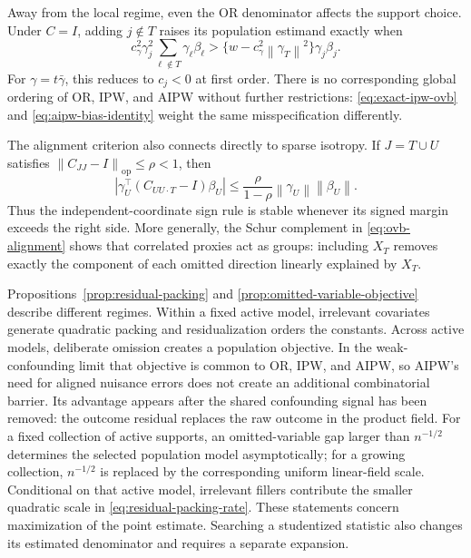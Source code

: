 \documentclass[a4paper,10pt,english]{article}
\newcommand{\norm}[1]{\left\lVert #1\right\rVert}
\begin{document}
Away from the local regime, even the OR denominator affects the support
choice.  Under $C=I$, adding $j\notin T$ raises its population estimand
exactly when
\begin{equation}\label{eq:exact-add-variable-rule}
 c_\gamma^2\gamma_j^2
 \sum_{\ell\notin T}\gamma_\ell\beta_\ell
 >\{w-c_\gamma^2\norm{\gamma_T}^2\}\gamma_j\beta_j.
\end{equation}
For $\gamma=t\bar\gamma$, this reduces to $c_j<0$ at first order.  There is
no corresponding global ordering of OR, IPW, and AIPW without further
restrictions: \eqref{eq:exact-ipw-ovb} and
\eqref{eq:aipw-bias-identity} weight the same misspecification differently.

The alignment criterion also connects directly to sparse isotropy.  If
$J=T\cup U$ satisfies
$\norm{C_{JJ}-I}_{\mathrm{op}}\le\rho<1$, then
\begin{equation}\label{eq:rip-ovb-stability}
 \left|\gamma_U^\top(C_{UU\cdot T}-I)\beta_U\right|
 \le\frac{\rho}{1-\rho}\norm{\gamma_U}\norm{\beta_U}.
\end{equation}
Thus the independent-coordinate sign rule is stable whenever its signed
margin exceeds the right side.  More generally, the Schur complement in
\eqref{eq:ovb-alignment} shows that correlated proxies act as groups:
including $X_T$ removes exactly the component of each omitted direction
linearly explained by $X_T$.

Propositions~\ref{prop:residual-packing} and
\ref{prop:omitted-variable-objective} describe different regimes.  Within
a fixed active model, irrelevant covariates generate quadratic packing and
residualization orders the constants.  Across active models, deliberate
omission creates a population objective.  In the weak-confounding limit
that objective is common to OR, IPW, and AIPW, so AIPW's need for aligned
nuisance errors does not create an additional combinatorial barrier.  Its
advantage appears after the shared confounding signal has been removed:
the outcome residual replaces the raw outcome in the product field.
For a fixed collection of active supports, an omitted-variable gap larger
than $n^{-1/2}$ determines the selected population model asymptotically;
for a growing collection, $n^{-1/2}$ is replaced by the corresponding
uniform linear-field scale.  Conditional on that active model, irrelevant
fillers contribute the smaller quadratic scale in
\eqref{eq:residual-packing-rate}.  These statements concern maximization of
the point estimate.  Searching a studentized statistic also changes its
estimated denominator and requires a separate expansion.
\end{document}
